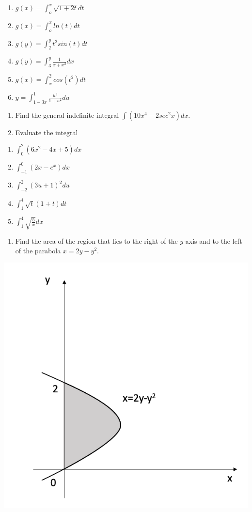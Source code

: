 \documentclass[]{book}
\providecommand{\tightlist}{%
  \setlength{\itemsep}{0pt}\setlength{\parskip}{0pt}}
\begin{document}
\begin{enumerate}
\def\labelenumi{(\alph{enumi})}
\tightlist
\item
  \(g(x) = \int_o^x\sqrt{1+2t}dt\)
\item
  \(g(x) = \int_o^xln(t)dt\)
\item
  \(g(y) = \int_2^yt^2sin(t)dt\)
\item
  \(g(y) = \int_3^y\frac{1}{x+x^2}dx\)
\item
  \(g(x) = \int_x^2cos(t^2)dt\)
\item
  \(y = \int_{1-3x}^1\frac{u^3}{1+u^2}du\)
\end{enumerate}

\begin{enumerate}
\def\labelenumi{\arabic{enumi}.}
\setcounter{enumi}{28}
\item
  Find the general indefinite integral \(\int(10x^4-2sec^2x)dx.\)
\item
  Evaluate the integral
\end{enumerate}

\begin{enumerate}
\def\labelenumi{(\alph{enumi})}
\tightlist
\item
  \(\int_0^2(6x^2-4x+5)dx\)
\item
  \(\int_{-1}^0(2x-e^x)dx\)
\item
  \(\int_{-2}^2(3u+1)^2du\)
\item
  \(\int_1^4\sqrt{t}(1+t)dt\)
\item
  \(\int_1^4\sqrt{\frac{5}{x}}dx\)
\end{enumerate}

\begin{enumerate}
\def\labelenumi{\arabic{enumi}.}
\setcounter{enumi}{30}
\tightlist
\item
  Find the area of the region that lies to the right of the \(y\)-axis and to the left of the parabola \(x=2y-y^2.\)
\end{enumerate}

\begin{center}\includegraphics[width=0.6\linewidth]{figure/c5Q31} \end{center}
\end{document}
